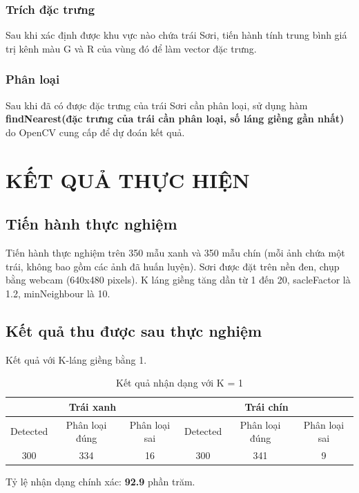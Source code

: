 \documentclass[12pt,a4paper]{article}
\begin{document}
\subsubsection{Trích đặc trưng}
Sau khi xác định được khu vực nào chứa trái Sơri, tiến hành tính trung bình giá trị kênh màu G và R của vùng đó để làm vector đặc trưng.
\subsubsection{Phân loại}
Sau khi đã có được đặc trưng của trái Sơri cần phân loại, sử dụng hàm \textbf{findNearest(đặc trưng của trái cần phân loại, số láng giềng gần nhất)} do OpenCV cung cấp để dự đoán kết quả.
\pagebreak
\section{KẾT QUẢ THỰC HIỆN}
\subsection{Tiến hành thực nghiệm}
Tiến hành thực nghiệm trên 350 mẫu xanh và 350 mẫu chín (mỗi ảnh chứa một trái, không bao gồm các ảnh đã huấn luyện). Sơri được đặt trên nền đen, chụp bằng webcam (640x480 pixels). K láng giềng tăng dần từ 1 đến 20, sacleFactor là 1.2, minNeighbour là 10.
\subsection{Kết quả thu được sau thực nghiệm}
Kết quả với K-láng giềng bằng 1.
\begin{center}
	\begin{table}[htp]
	\begin{center}
	\begin{tabular}{|c|c|c|c|c|c|}
	\hline
	\multicolumn{3}{|c|}{Trái xanh} & \multicolumn{3}{|c|}{Trái chín}\\
	\hline
	Detected & Phân loại đúng & Phân loại sai & Detected & Phân loại đúng & Phân loại sai\\
	\hline
	300 & 334 & 16 & 300 & 341 & 9\\
	\hline 
	\end{tabular}
	\begin{center}
	\caption{Kết quả nhận dạng với K = 1}
	\end{center}
	\end{center}
	\end{table}
\end{center}

Tỷ lệ nhận dạng chính xác: \textbf{92.9} phần trăm.
\end{document}
